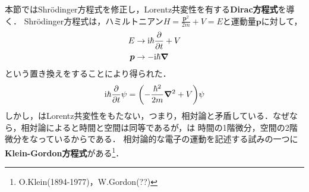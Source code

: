 \documentclass{report}
\begin{document}
  本節ではShrödinger方程式を修正し，Lorentz共変性を有する\textbf{Dirac方程式}を導く．
  Shrödinger方程式は，ハミルトニアン$H=\frac{\bm{p}^2}{2m} + V = E$と運動量$\bm{p}$に対して，
  \begin{align}
    E &\to \mathrm{i}\hbar\pdv{t} + V \\ 
    \bm{p} &\to - \mathrm{i}\hbar\grad 
  \end{align}
  という置き換えをすることにより得られた．
  \begin{align}
    \mathrm{i}\hbar \pdv{t}\psi = \qty(-\frac{\hbar^2}{2m}\grad^2 + V)\psi \label{TDSE}
  \end{align}
  しかし，はLorentz共変性をもたない，つまり，相対論と矛盾している．なぜなら，相対論によると時間と空間は同等であるが，は
  時間の1階微分，空間の2階微分をなっているからである．
  相対論的な電子の運動を記述する試みの一つに\textbf{Klein-Gordon方程式}がある\footnote{
    O.Klein(1894-1977)，W.Gordon(??)
  }．
\end{document}
